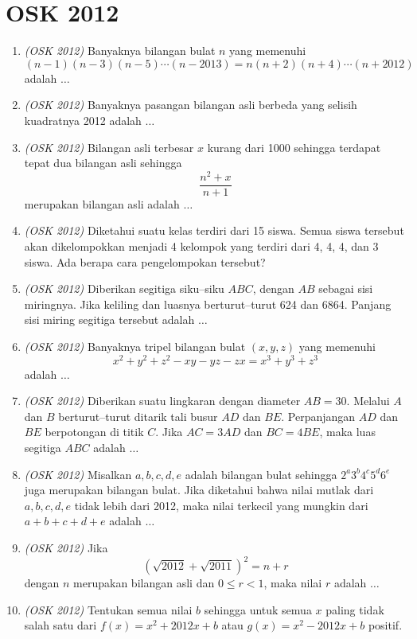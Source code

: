 \newpage


\section{OSK 2012}

\begin{enumerate}
	\item \textit{(OSK 2012)} Banyaknya bilangan bulat $n$ yang memenuhi  
	$$(n-1)(n-3)(n-5)\cdots(n-2013) = n(n+2)(n+4)\cdots(n+2012)$$  
	adalah $\dots$
	\item \textit{(OSK 2012)} Banyaknya pasangan bilangan asli berbeda yang selisih kuadratnya 2012 adalah $\dots$
	\item \textit{(OSK 2012)} Bilangan asli terbesar $x$ kurang dari 1000 sehingga terdapat tepat dua bilangan asli sehingga  
	\[
	\frac{n^2 + x}{n+1}
	\]
	merupakan bilangan asli adalah $\dots$
	
	\item \textit{(OSK 2012)} Diketahui suatu kelas terdiri dari 15 siswa. Semua siswa tersebut akan dikelompokkan menjadi 4 kelompok yang terdiri dari 4, 4, 4, dan 3 siswa. Ada berapa cara pengelompokan tersebut?
	
	\item \textit{(OSK 2012)} Diberikan segitiga siku–siku $ABC$, dengan $AB$ sebagai sisi miringnya. Jika keliling dan luasnya berturut–turut 624 dan 6864. Panjang sisi miring segitiga tersebut adalah $\dots$
	
	\item \textit{(OSK 2012)} Banyaknya tripel bilangan bulat $(x,y,z)$ yang memenuhi  
	\[
	x^2 + y^2 + z^2 - xy - yz - zx = x^3 + y^3 + z^3
	\]
	adalah $\dots$
	
	\item \textit{(OSK 2012)} Diberikan suatu lingkaran dengan diameter $AB = 30$. Melalui $A$ dan $B$ berturut–turut ditarik tali busur $AD$ dan $BE$. Perpanjangan $AD$ dan $BE$ berpotongan di titik $C$. Jika  
	$AC = 3AD$ dan $BC = 4BE$, maka luas segitiga $ABC$ adalah $\dots$
	
	\item \textit{(OSK 2012)} Misalkan $a,b,c,d,e$ adalah bilangan bulat sehingga $2^a 3^b 4^c 5^d 6^e$ juga merupakan bilangan bulat. Jika diketahui bahwa nilai mutlak dari $a,b,c,d,e$ tidak lebih dari 2012, maka nilai terkecil yang mungkin dari $a+b+c+d+e$ adalah $\dots$
	
	\item \textit{(OSK 2012)} Jika  
	\[
	\left(\sqrt{2012} + \sqrt{2011}\right)^2 = n + r
	\]
	dengan $n$ merupakan bilangan asli dan $0 \le r < 1$, maka nilai $r$ adalah $\dots$
	\item \textit{(OSK 2012)} Tentukan semua nilai $b$ sehingga untuk semua $x$ paling tidak salah satu dari  
	$f(x)=x^2 + 2012x + b$ atau $g(x)=x^2 - 2012x + b$ positif.
	

\end{enumerate}
